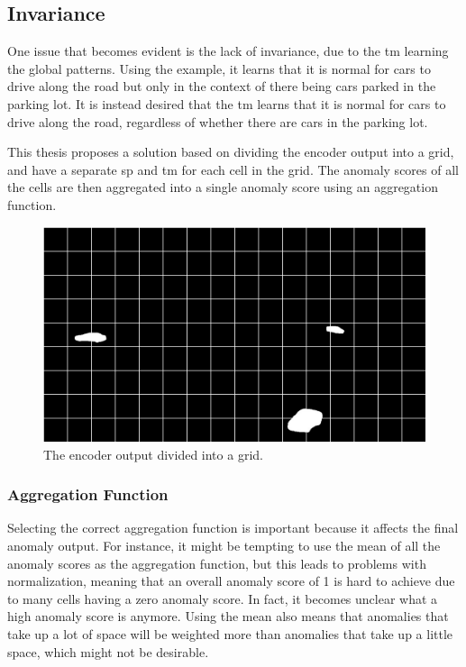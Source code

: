 \subsection{Invariance}
One issue that becomes evident is the lack of invariance, due to the \gls*{tm} learning the global patterns. Using the example, it learns that it is normal for cars to drive along the road but only in the context of there being cars parked in the parking lot. It is instead desired that the \gls*{tm} learns that it is normal for cars to drive along the road, regardless of whether there are cars in the parking lot.
\par
This thesis proposes a solution based on dividing the encoder output into a grid, and have a separate \gls*{sp} and \gls*{tm} for each cell in the grid. The anomaly scores of all the cells are then aggregated into a single anomaly score using an aggregation function.
\begin{figure}[H]
    \centering
    \includegraphics[width=\textwidth]{resources/methodology/car_segmentation_grid.png}
    \caption{The encoder output divided into a grid.}
    \label{fig:grid}
\end{figure}
\subsubsection{Aggregation Function}
Selecting the correct aggregation function is important because it affects the final anomaly output. For instance, it might be tempting to use the mean of all the anomaly scores as the aggregation function, but this leads to problems with normalization, meaning that an overall anomaly score of 1 is hard to achieve due to many cells having a zero anomaly score. In fact, it becomes unclear what a high anomaly score is anymore. Using the mean also means that anomalies that take up a lot of space will be weighted more than anomalies that take up a little space, which might not be desirable.


